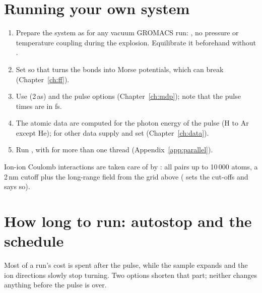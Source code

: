 \section{Running your own system}

\begin{enumerate}
  \item Prepare the system as for any vacuum GROMACS run: , no pressure or temperature coupling during
    the explosion.
    Equilibrate it beforehand without .
  \item Set  so that  turns the bonds into Morse potentials, which can break
    (Chapter~\ref{ch:ff}).
  \item Use  (2\,as) and the pulse options  (Chapter~\ref{ch:mdp}); note that
    the pulse times are in fs.
  \item The atomic data are computed for the photon energy of the pulse (H to Ar except He); for other data supply
     and set  (Chapter~\ref{ch:data}).
  \item Run , with  for more than one thread (Appendix~\ref{app:parallel}).
\end{enumerate}
Ion-ion Coulomb interactions are taken care of by : all pairs up to 10\,000 atoms,
a 2\,nm cutoff plus the long-range field from the grid above ( sets the cut-offs and says so).

\section{How long to run: autostop and the schedule}
\label{sec:autostop}
\label{sec:schedule}

Most of a run's cost is spent after the pulse, while the sample expands and the ion directions slowly stop turning.
Two options shorten that part; neither changes anything before the pulse is over.

